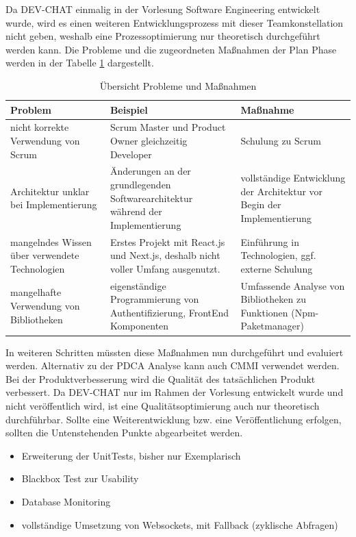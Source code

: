 Da DEV-CHAT einmalig in der Vorlesung Software Engineering entwickelt wurde, wird es einen weiteren Entwicklungsprozess mit dieser Teamkonstellation nicht geben, weshalb eine Prozessoptimierung nur theoretisch durchgeführt werden kann.
Die Probleme und die zugeordneten Maßnahmen der Plan Phase werden in der Tabelle \ref{tab:pdca} dargestellt.
\begin{table}[H]
    \begin{tabular}{l|l|l}
    Problem                                        &Beispiel                                                                         & Maßnahme                                                               \\ \hline
    nicht korrekte Verwendung von Scrum            & Scrum Master und Product Owner gleichzeitig Developer                            & Schulung zu Scrum                                                      \\\hline
    Architektur unklar bei Implementierung         & Änderungen an der grundlegenden Softwarearchitektur während der Implementierung  & vollständige Entwicklung der Architektur vor Begin der Implementierung \\\hline
    mangelndes Wissen über verwendete Technologien & Erstes Projekt mit React.js und Next.js, deshalb nicht voller Umfang ausgenutzt. & Einführung in Technologien, ggf. externe Schulung                      \\\hline
    mangelhafte Verwendung von Bibliotheken        & eigenständige Programmierung von Authentifizierung, FrontEnd Komponenten         & Umfassende Analyse von Bibliotheken zu Funktionen (Npm-Paketmanager)  
    \end{tabular}
    \caption{Übersicht Probleme und Maßnahmen}
    \label{tab:pdca}
\end{table}\noindent
In weiteren Schritten müssten diese Maßnahmen nun durchgeführt und evaluiert werden.
Alternativ zu der PDCA Analyse kann auch \ac{CMMI} verwendet werden.
\newparagraph
Bei der Produktverbesserung wird die Qualität des tatsächlichen Produkt verbessert.
Da DEV-CHAT nur im Rahmen der Vorlesung entwickelt wurde und nicht veröffentlich wird, ist eine Qualitätsoptimierung auch nur theoretisch durchführbar. 
Sollte eine Weiterentwicklung bzw. eine Veröffentlichung erfolgen, sollten die Untenstehenden Punkte abgearbeitet werden.
\begin{itemize}
    \item Erweiterung der UnitTests, bisher nur Exemplarisch
    \item Blackbox Test zur Usability
    \item Database Monitoring
    \item vollständige Umsetzung von Websockets, mit Fallback (zyklische Abfragen)
\end{itemize}

